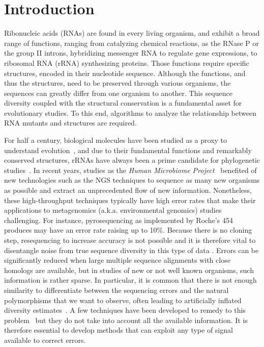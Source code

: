 \section{Introduction}
\label{sec:introduction}

Ribonucleic acids (RNAs) are found in every living organism, and exhibit a broad range of functions, ranging from catalyzing
chemical reactions, as the RNase P or the group II introns, hybridizing  messenger RNA to regulate gene expressions,
to ribosomal RNA (rRNA) synthesizing proteins. Those functions  require specific structures,  encoded in their nucleotide
sequence. Although the functions, and thus the structures, need to be preserved through various organisms, the sequences
can greatly differ from one organism to another. This sequence diversity coupled with the structural conservation is a fundamental
asset for evolutionary studies. To this end, algorithms to analyze the relationship between RNA mutants and structures are required.

For half a century, biological molecules have been studied as a proxy to understand evolution~\citep{Zuckerkandl1965}, and due
to their fundamental functions and remarkably conserved structures, rRNAs have always been a prime candidate for phylogenetic
studies~\citep{Olsen1986, Olsen1993}. In recent years, studies as the \emph{Human Microbiome Project}~\citep{Turnbaugh2007} benefited
of new technologies such as the NGS techniques to sequence as many new organisms as possible and extract an unprecedented flow of new information. 
Nonetheless, these high-throughput techniques typically have high error rates that make their applications to metagenomics (a.k.a. environmental
genomics) studies challenging. For instance, pyrosequencing as implemented by Roche's 454 produces may have an error rate raising up to 10\%.
Because there is no cloning step, resequencing to increase accuracy is not possible and it is therefore vital to disentangle noise from true sequence
diversity in this type of data \citep{Quince:2009uq}. Errors can be significantly reduced  when large multiple sequence alignments with close homologs
are available, but in studies of new or not well known organisms, such information is rather sparse. In particular, it is common that there is not enough  similarity to 
differentiate between the sequencing errors and the natural polymorphisms that we want to observe, often leading to artificially inflated diversity estimates~\citep{Kunin2010}.
A few techniques have been developed to remedy to this problem~\citep{Quinlan2008,Medvedev2011} but they do not take
into account all the available information. It is therefore essential to develop methods that can exploit any type of signal available to correct errors.  


